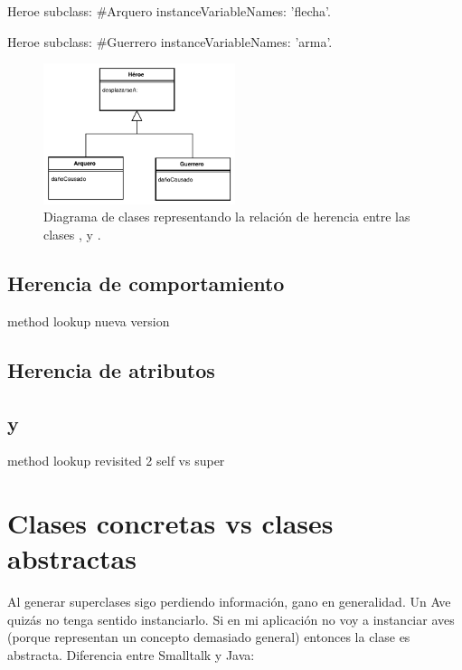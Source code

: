 \documentclass[a4paper,12pt]{book}
\begin{document}
\begin{code}
Heroe subclass: #Arquero
	instanceVariableNames: 'flecha'.
	
Heroe subclass: #Guerrero
	instanceVariableNames: 'arma'.
\end{code}

\begin{figure}
    \centering
    \includegraphics[width=0.5\textwidth]{figures/herencia}
    \caption{Diagrama de clases representando la relación de herencia entre las clases ,  y .\label{fig:herencia_uml}}
\end{figure}

\subsection{Herencia de comportamiento}

method lookup nueva version

\subsection{Herencia de atributos}

\subsection{ y }


method lookup revisited 2
self vs super

\section{Clases concretas vs clases abstractas}

Al generar superclases sigo perdiendo información, gano en generalidad. Un Ave quizás no
tenga sentido instanciarlo. Si en mi aplicación no voy a instanciar aves (porque representan un
concepto demasiado general) entonces la clase es abstracta.
Diferencia entre Smalltalk y Java:
\end{document}

